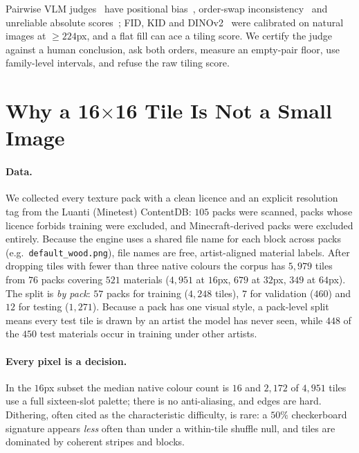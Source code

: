 \documentclass{article}
\begin{document}
Pairwise VLM judges~\citep{zheng2023mtbench} have positional
bias~\citep{wang2024fair}, order-swap inconsistency~\citep{webdevjudge2025}
and unreliable absolute scores~\citep{kumar2026rankscore};
FID, KID and DINOv2~\citep{heusel2017fid,binkowski2018kid,stein2023exposing,oquab2024dinov2}
were calibrated on natural images at $\geq224$px, and a flat fill can ace a
tiling score. We certify the judge against a human conclusion, ask both
orders, measure an empty-pair floor, use family-level intervals, and refuse
the raw tiling score.

\section{Why a 16$\times$16 Tile Is Not a Small Image}
\label{sec:task}

\paragraph{Data.} We collected every texture pack with a clean licence and an
explicit resolution tag from the Luanti (Minetest) ContentDB: $105$ packs were
scanned, packs whose licence forbids training were excluded, and
Minecraft-derived packs were excluded entirely. Because the engine uses a
shared file name for each block across packs (e.g.\ \texttt{default\_wood.png}),
file names are free, artist-aligned material labels. After dropping tiles with
fewer than three native colours the corpus has $5{,}979$ tiles from $76$ packs
covering $521$ materials ($4{,}951$ at $16$px, $679$ at $32$px, $349$ at
$64$px). The split is \emph{by pack}: $57$ packs for training ($4{,}248$
tiles), $7$ for validation ($460$) and $12$ for testing ($1{,}271$). Because a
pack has one visual style, a pack-level split means every test tile is drawn by
an artist the model has never seen, while $448$ of the $450$ test materials
occur in training under other artists.

\paragraph{Every pixel is a decision.} In the $16$px subset the median native
colour count is $16$ and $2{,}172$ of $4{,}951$ tiles use a full sixteen-slot
palette; there is no anti-aliasing, and edges are hard. Dithering, often cited
as the characteristic difficulty, is rare: a $50\%$ checkerboard signature
appears \emph{less} often than under a within-tile shuffle null, and tiles are
dominated by coherent stripes and blocks.
\end{document}
